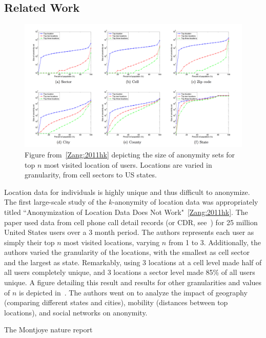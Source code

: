 



\subsection{Related Work}
\begin{figure}[t]
  \centering
  \includegraphics[width=\linewidth]{fig/zang_bolot.png}
  \caption{Figure from~\ref{Zang:2011hk} depicting the size of anonymity sets for top $n$ most visited location of users.
           Locations are varied in granularity, from cell sectors to US states.}
  \label{fig:zang_bolot}
\end{figure}

Location data for individuals is highly unique and thus difficult to anonymize.
The first large-scale study of the $k$-anonymity of location data was appropriately titled ``Anonymization of Location Data Does Not Work"~\ref{Zang:2011hk}.
The paper used data from cell phone call detail records (or CDR, see~) for 25 million United States users over a 3 month period.
The authors represents each user as simply their top $n$ most visited locations, varying $n$ from 1 to 3.
Additionally, the authors varied the granularity of the locations, with the smallest as cell sector and the largest as state.
Remarkably, using 3 locations at a cell level made half of all users completely unique, and 3 locations a sector level made 85\% of all users unique.
A figure detailing this result and results for other granularities and values of $n$ is depicted in~.
The authors went on to analyze the impact of geography (comparing different states and cities), mobility (distances between top locations), and social networks on anonymity.


The Montjoye nature report


